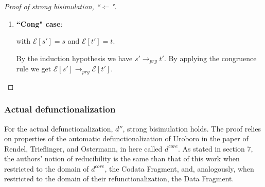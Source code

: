 \documentclass[11pt]{article} %
\begin{document}
\begin{proof}[Proof of strong bisimulation, ``$\Leftarrow$"]
\begin{enumerate}
\begin{itemize}
With that, $\sigma = t^1_1 / x_1, ..., t^1_k / x_k, t_2 / y_2, ..., t_n / y_n$ and we also know the form of $s$: $s = fun(con(t^1_1, ..., t^1_k), t_2, ..., t_n)$. Now, set $\mathcal{D}_{\textrm{PM}, 1}$ as follows:

\begin{prooftree}
\end{prooftree}

In the derivation above, $\sigma_2 = con(t_1^1 ..., t_k^1) / y_1,  t_2 / y_2, ...,  t_n / y_n$ and thus:

$t = s'[\sigma] = s'_2[con(x_1, ..., x_k) / y_1][\sigma] = s'_2[con(t^1_1, ..., t^1_k) / y_1, t_2 / y_2, ..., t_n / y_n] = s'_2[\sigma_2]$

There is no conflict between the substitutions for, e.g., $x_1$ and $y_2$, since all variables that are substituted are distinct, as can be seen in the definition of $split$.

\end{itemize}

This concludes the proof for the ``Subst" case.

\item \textbf{``Cong" case}:

\begin{prooftree}
\end{prooftree}

with $\mathcal{E}[s'] = s$ and $\mathcal{E}[t'] = t$.

By the induction hypothesis we have $s' \longrightarrow_{prg} t'$. By applying the congruence rule we get $\mathcal{E}[s'] \longrightarrow_{prg} \mathcal{E}[t']$.

\end{enumerate}

\end{proof}

\subsubsection{Actual defunctionalization}

For the actual defunctionalization, $d''$, strong bisimulation holds. The proof relies on properties of the automatic defunctionalization of Uroboro in the paper of Rendel, Trieflinger, and Ostermann, in here called $d^{core}$. As stated in section 7, the authors' notion of reducibility is the same than that of this work when restricted to the domain of $d^{core}$, the Codata Fragment, and, analogously, when restricted to the domain of their refunctionalization, the Data Fragment.
\end{document}
